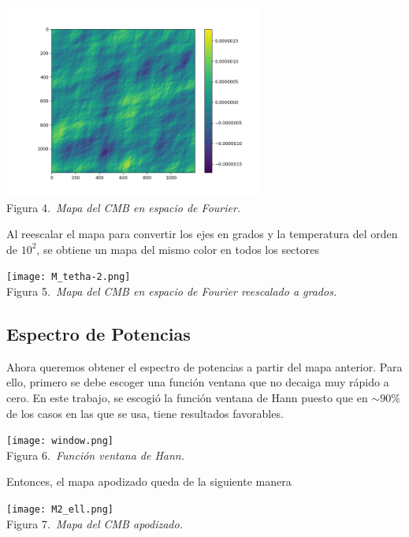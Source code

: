 \documentclass[twocolumn,letterpaper,spanish]{revtex4}
\numberwithin{equation}{section}
\begin{document}
\begin{center}
   \includegraphics[width=85mm]{M_tetha.png}\\
   Figura 4.\emph{\ Mapa del CMB en espacio de Fourier.}
\end{center}

Al reescalar el mapa para convertir los ejes en grados y la temperatura del orden de $10^2$, se obtiene un mapa del mismo color en todos los sectores

\begin{center}
   \texttt{[image: M\_tetha-2.png]}\\
   Figura 5.\emph{\ Mapa del CMB en espacio de Fourier reescalado a grados.}
\end{center}

\subsection{Espectro de Potencias}

Ahora queremos obtener el espectro de potencias a partir del mapa anterior. Para ello, primero se debe escoger una funci\'on ventana que no decaiga muy r\'apido a cero. En este trabajo, se escogi\'o la funci\'on ventana de Hann puesto que en $\sim 90 \%$ de los casos en las que se usa, tiene resultados favorables.

\begin{center}
   \texttt{[image: window.png]}\\
   Figura 6.\emph{\ Funci\'on ventana de Hann.}
\end{center}

Entonces, el mapa apodizado queda de la siguiente manera

\begin{center}
  \texttt{[image: M2\_ell.png]}\\
   Figura 7.\emph{\ Mapa del CMB apodizado.}
\end{center}
\end{document}
